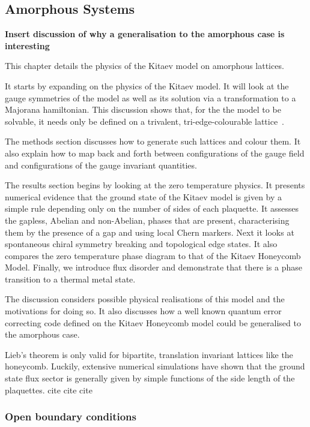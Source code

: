 \hypertarget{amorphous-systems}{%
\subsection{Amorphous Systems}\label{amorphous-systems}}

\textbf{Insert discussion of why a generalisation to the amorphous case is interesting}

This chapter details the physics of the Kitaev model on amorphous lattices.

It starts by expanding on the physics of the Kitaev model. It will look at the gauge symmetries of the model as well as its solution via a transformation to a Majorana hamiltonian. This discussion shows that, for the the model to be solvable, it needs only be defined on a trivalent, tri-edge-colourable lattice~\autocite{Nussinov2009}.

The methods section discusses how to generate such lattices and colour them. It also explain how to map back and forth between configurations of the gauge field and configurations of the gauge invariant quantities.

The results section begins by looking at the zero temperature physics. It presents numerical evidence that the ground state of the Kitaev model is given by a simple rule depending only on the number of sides of each plaquette. It assesses the gapless, Abelian and non-Abelian, phases that are present, characterising them by the presence of a gap and using local Chern markers. Next it looks at spontaneous chiral symmetry breaking and topological edge states. It also compares the zero temperature phase diagram to that of the Kitaev Honeycomb Model. Finally, we introduce flux disorder and demonstrate that there is a phase transition to a thermal metal state.

The discussion considers possible physical realisations of this model and the motivations for doing so. It also discusses how a well known quantum error correcting code defined on the Kitaev Honeycomb model could be generalised to the amorphous case.

Lieb's theorem is only valid for bipartite, translation invariant lattices like the honeycomb. Luckily, extensive numerical simulations have shown that the ground state flux sector is generally given by simple functions of the side length of the plaquettes. cite cite cite

\hypertarget{open-boundary-conditions}{%
\subsubsection{Open boundary conditions}\label{open-boundary-conditions}}


